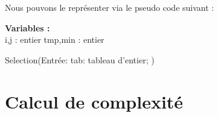 \par
Nous pouvons le représenter via le pseudo code suivant :
\par
\begin{function}[H]
    \textbf{Variables :}\\
    i,j : entier\;
    tmp,min : entier\;
    
    
    \caption{Selection(Entrée: tab: tableau d'entier; )}
\end{function}
\section{Calcul de complexité}
